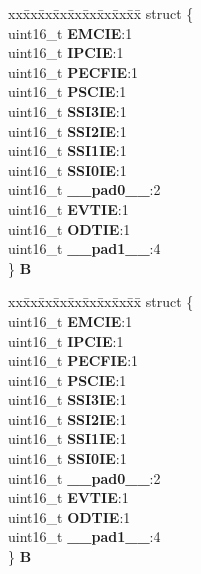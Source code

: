 \begin{DoxyCompactItemize}
\begin{tabbing}
\end{tabbing}\item 
\mbox{\label{unionuPIER1_ab7bda12cd9edfee8a5c944f801348574}} 
\begin{tabbing}
xx\=xx\=xx\=xx\=xx\=xx\=xx\=xx\=xx\=\kill
struct \{\\
\>uint16\_t {\bfseries EMCIE}:1\\
\>uint16\_t {\bfseries IPCIE}:1\\
\>uint16\_t {\bfseries PECFIE}:1\\
\>uint16\_t {\bfseries PSCIE}:1\\
\>uint16\_t {\bfseries SSI3IE}:1\\
\>uint16\_t {\bfseries SSI2IE}:1\\
\>uint16\_t {\bfseries SSI1IE}:1\\
\>uint16\_t {\bfseries SSI0IE}:1\\
\>uint16\_t {\bfseries \_\_pad0\_\_}:2\\
\>uint16\_t {\bfseries EVTIE}:1\\
\>uint16\_t {\bfseries ODTIE}:1\\
\>uint16\_t {\bfseries \_\_pad1\_\_}:4\\
\} {\bfseries B}\\

\end{tabbing}\item 
\mbox{\label{unionuPIER1_ac9380d74e3dbbbdceda2fe759f032eb0}} 
\begin{tabbing}
xx\=xx\=xx\=xx\=xx\=xx\=xx\=xx\=xx\=\kill
struct \{\\
\>uint16\_t {\bfseries EMCIE}:1\\
\>uint16\_t {\bfseries IPCIE}:1\\
\>uint16\_t {\bfseries PECFIE}:1\\
\>uint16\_t {\bfseries PSCIE}:1\\
\>uint16\_t {\bfseries SSI3IE}:1\\
\>uint16\_t {\bfseries SSI2IE}:1\\
\>uint16\_t {\bfseries SSI1IE}:1\\
\>uint16\_t {\bfseries SSI0IE}:1\\
\>uint16\_t {\bfseries \_\_pad0\_\_}:2\\
\>uint16\_t {\bfseries EVTIE}:1\\
\>uint16\_t {\bfseries ODTIE}:1\\
\>uint16\_t {\bfseries \_\_pad1\_\_}:4\\
\} {\bfseries B}\\


\end{tabbing}
\end{DoxyCompactItemize}
